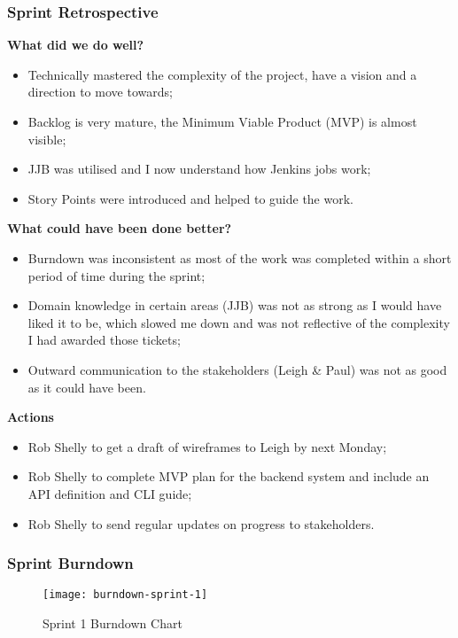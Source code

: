 		\subsubsection{Sprint Retrospective}
		\textbf{What did we do well?}
		\begin{itemize}	
			\item Technically mastered the complexity of the project, have a
			vision and a direction to move towards;
			\item Backlog is very mature, the Minimum Viable Product (MVP) is almost visible;
			\item JJB was utilised and I now understand how Jenkins jobs
			work;
			\item Story Points were introduced and helped to guide the work.
		\end{itemize}
		
		\noindent\textbf{What could have been done better?}
		\begin{itemize}
			\item Burndown was inconsistent as most of the work was completed within a short period of time during the sprint;
			\item Domain knowledge in certain areas (JJB) was not as strong
			as I would have liked it to be, which slowed me down and
			was not reflective of the complexity I had awarded those
			tickets;
			\item Outward communication to the stakeholders (Leigh \& Paul)
			was not as good as it could have been.
		\end{itemize}

		\noindent\textbf{Actions}
		\begin{itemize}
			\item Rob Shelly to get a draft of wireframes to Leigh by next Monday;
			\item Rob Shelly to complete MVP plan for the backend system and include an API definition and CLI guide;
      \item Rob Shelly to send regular updates on progress to stakeholders.
		\end{itemize}

		\subsubsection{Sprint Burndown}
		
 		\begin{figure}[H]
      \setlength{\belowcaptionskip}{15pt plus 3pt minus 2pt}
      \caption{Sprint 1 Burndown Chart}
      \centering
      \texttt{[image: burndown-sprint-1]}
      \label{fig:burndown-sprint-1}
    \end{figure}
   

